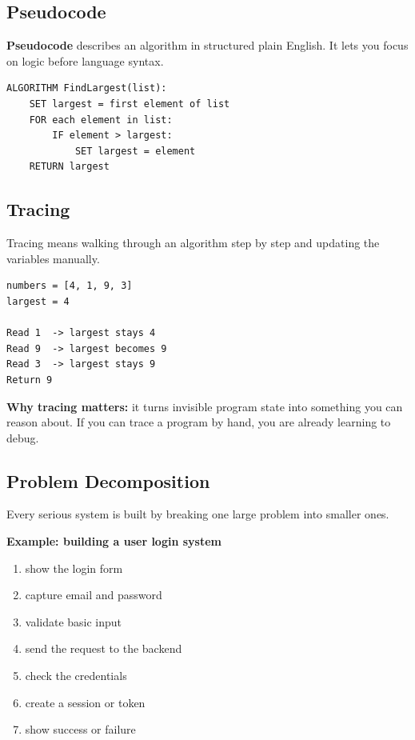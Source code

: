 \documentclass[12pt, a4paper, oneside]{book}
\begin{document}
\subsection{Pseudocode}
\textbf{Pseudocode} describes an algorithm in structured plain English. It lets you focus on logic before language syntax.

\begin{lstlisting}[caption={Pseudocode example: finding the largest number in a list}]
ALGORITHM FindLargest(list):
    SET largest = first element of list
    FOR each element in list:
        IF element > largest:
            SET largest = element
    RETURN largest
\end{lstlisting}

\subsection{Tracing}
Tracing means walking through an algorithm step by step and updating the variables manually.

\begin{lstlisting}[caption={Trace exercise idea}]
numbers = [4, 1, 9, 3]
largest = 4

Read 1  -> largest stays 4
Read 9  -> largest becomes 9
Read 3  -> largest stays 9
Return 9
\end{lstlisting}

\textbf{Why tracing matters:} it turns invisible program state into something you can reason about. If you can trace a program by hand, you are already learning to debug.

\subsection{Problem Decomposition}
Every serious system is built by breaking one large problem into smaller ones.

\textbf{Example: building a user login system}
\begin{enumerate}[leftmargin=2em]
    \item show the login form
    \item capture email and password
    \item validate basic input
    \item send the request to the backend
    \item check the credentials
    \item create a session or token
    \item show success or failure
\end{enumerate}
\end{document}

